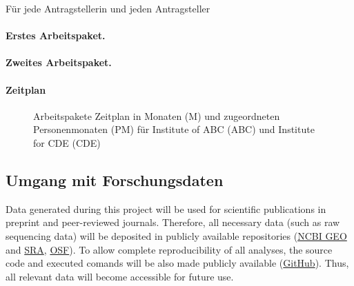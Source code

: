 \documentclass{scrartcl}
\begin{document}
Für jede Antragstellerin und jeden Antragsteller

\hrulefill
\paragraph{Erstes Arbeitspaket.}
\label{wp:1}



\hrulefill
\paragraph{Zweites Arbeitspaket.}
\label{wp:2}





\let\theparagraph=\oldpara
\paragraph*{Zeitplan}
\vspace{-0.5cm}
\begin{figure}[h]
	\centering
  	\resizebox{\textwidth}{!}{}
	\caption{Arbeitspakete Zeitplan in Monaten (M) und zugeordneten Personenmonaten (PM) f\"ur Institute of ABC (ABC) und Institute for CDE (CDE)}
	\label{fig:timeline}
\end{figure}

\subsection{Umgang mit Forschungsdaten}
Data generated during this project will be used for scientific publications in
preprint and peer-reviewed journals. Therefore, all necessary data (such as raw
sequencing data) will be deposited in publicly available repositories
(\href{https://www.ncbi.nlm.nih.gov/geo/}{NCBI GEO} and
\href{https://www.ncbi.nlm.nih.gov/sra}{SRA}, \href{https://osf.io/}{OSF}). To
allow complete reproducibility of all analyses, the source code and executed
comands will be also made publicly available
(\href{https://github.com/}{GitHub}).  Thus, all relevant data will become
accessible for future use. 
\end{document}

